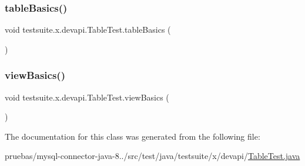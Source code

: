 \subsubsection{\texorpdfstring{table\+Basics()}{tableBasics()}}
{\footnotesize\ttfamily void testsuite.\+x.\+devapi.\+Table\+Test.\+table\+Basics (\begin{DoxyParamCaption}{ }\end{DoxyParamCaption})}

\mbox{\label{classtestsuite_1_1x_1_1devapi_1_1_table_test_ae3685af97260bbfe0e12aa371f38d059}} 
\subsubsection{\texorpdfstring{view\+Basics()}{viewBasics()}}
{\footnotesize\ttfamily void testsuite.\+x.\+devapi.\+Table\+Test.\+view\+Basics (\begin{DoxyParamCaption}{ }\end{DoxyParamCaption})}



The documentation for this class was generated from the following file\+:\begin{DoxyCompactItemize}
\item 
pruebas/mysql-\/connector-\/java-\/8../src/test/java/testsuite/x/devapi/\mbox{\hyperlink{_table_test_8java}{Table\+Test.\+java}}\end{DoxyCompactItemize}
